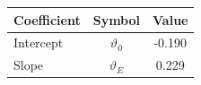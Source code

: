 \begin{tabular}{lcc}
\hline\hline
Coefficient & Symbol & Value \\
\hline
Intercept & $\vartheta_0$ & -0.190 \\
Slope & $\vartheta_E$ & 0.229 \\
\hline
\end{tabular}